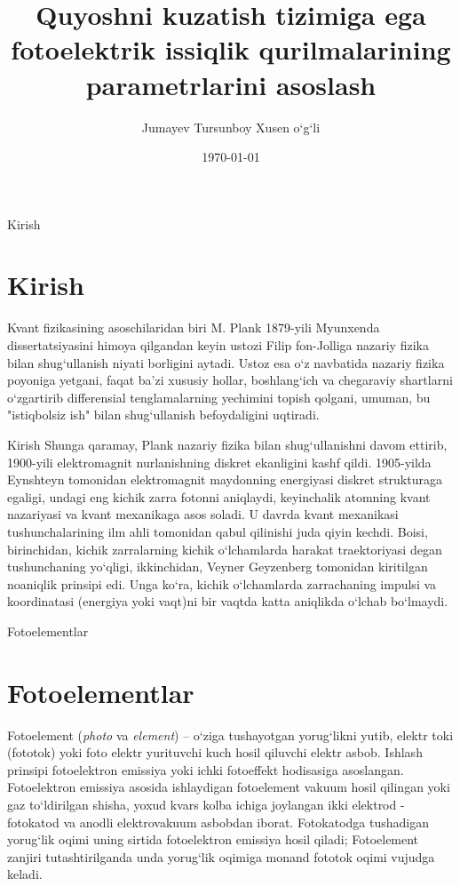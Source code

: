 \documentclass{beamer}
\title{Quyoshni kuzatish tizimiga ega fotoelektrik issiqlik qurilmalarining parametrlarini asoslash}
\subtitle{}
\author{Jumayev Tursunboy Xusen o`g`li}
\institute{\texttt Mutaxassislik: 5A140204 -- Fizika (yo`nalishlar bo`yicha). Lazer fizikasi}
\date{\today}
\begin{document}
\begin{frame}
	\titlepage
\end{frame}

\begin{frame}
	\renewcommand{\contentsname}{Mundarija}
	\tableofcontents
\end{frame}
\begin{frame}{Kirish}
	\section{Kirish}
	Kvant fizikasining asoschilaridan biri M. Plank 1879-yili Myunxenda dissertatsiyasini himoya qilgandan keyin ustozi Filip fon-Jolliga nazariy fizika bilan shug`ullanish niyati borligini aytadi. Ustoz esa o`z navbatida nazariy fizika poyoniga yetgani, faqat ba'zi xususiy hollar, boshlang`ich va chegaraviy shartlarni o`zgartirib differensial tenglamalarning yechimini topish qolgani, umuman, bu "istiqbolsiz ish" bilan shug`ullanish befoydaligini uqtiradi.
\end{frame}
\begin{frame}{Kirish}
	Shunga qaramay, Plank nazariy fizika bilan shug`ullanishni davom ettirib, 1900-yili elektromagnit nurlanishning diskret ekanligini kashf qildi. 1905-yilda Eynshteyn tomonidan elektromagnit maydonning energiyasi diskret strukturaga egaligi, undagi eng kichik zarra fotonni aniqlaydi, keyinchalik atomning kvant nazariyasi va kvant mexanikaga asos soladi. U davrda kvant mexanikasi tushunchalarining ilm ahli tomonidan qabul qilinishi juda qiyin kechdi. Boisi, birinchidan, kichik zarralarning kichik o`lchamlarda harakat traektoriyasi degan tushunchaning yo`qligi, ikkinchidan, Veyner Geyzenberg tomonidan kiritilgan noaniqlik prinsipi edi. Unga ko`ra, kichik o`lchamlarda zarrachaning impulsi va koordinatasi (energiya yoki vaqt)ni bir vaqtda katta aniqlikda o`lchab bo`lmaydi.
\end{frame}
\begin{frame}{Fotoelementlar}
	\section{Fotoelementlar}
	Fotoelement (\textit{photo} va \textit{element}) -- o`ziga tushayotgan yorug`likni yutib, elektr toki (fototok) yoki foto elektr yurituvchi kuch hosil qiluvchi elektr asbob. Ishlash prinsipi fotoelektron emissiya yoki ichki fotoeffekt hodisasiga asoslangan. Fotoelektron emissiya asosida ishlaydigan fotoelement vakuum hosil qilingan yoki gaz to`ldirilgan shisha, yoxud kvars kolba ichiga joylangan ikki elektrod - fotokatod va anodli elektrovakuum asbobdan iborat. Fotokatodga tushadigan yorug`lik oqimi uning sirtida fotoelektron emissiya hosil qiladi; Fotoelement zanjiri tutashtirilganda unda yorug`lik oqimiga monand fototok oqimi vujudga keladi. 
\end{frame}
\end{document}
